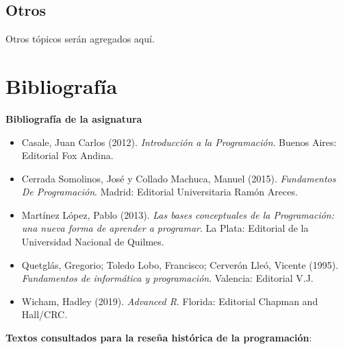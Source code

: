 \documentclass[
]{book}
\providecommand{\tightlist}{%
  \setlength{\itemsep}{0pt}\setlength{\parskip}{0pt}}
\begin{document}
\hypertarget{otros}{%
\section{Otros}\label{otros}}

Otros tópicos serán agregados aquí.

\hypertarget{bibliografuxeda}{%
\chapter*{Bibliografía}\label{bibliografuxeda}}

\textbf{Bibliografía de la asignatura}

\begin{itemize}
\tightlist
\item
  Casale, Juan Carlos (2012). \emph{Introducción a la Programación}. Buenos Aires: Editorial Fox Andina.
\item
  Cerrada Somolinos, José y Collado Machuca, Manuel (2015). \emph{Fundamentos De Programación}. Madrid: Editorial Universitaria Ramón Areces.
\item
  Martínez López, Pablo (2013). \emph{Las bases conceptuales de la Programación: una nueva forma de aprender a programar}. La Plata: Editorial de la Universidad Nacional de Quilmes.
\item
  Quetglás, Gregorio; Toledo Lobo, Francisco; Cerverón Lleó, Vicente (1995). \emph{Fundamentos de informática y programación}. Valencia: Editorial V.J.
\item
  Wicham, Hadley (2019). \emph{Advanced R}. Florida: Editorial Chapman and Hall/CRC.
\end{itemize}

\textbf{Textos consultados para la reseña histórica de la programación}:
\end{document}
